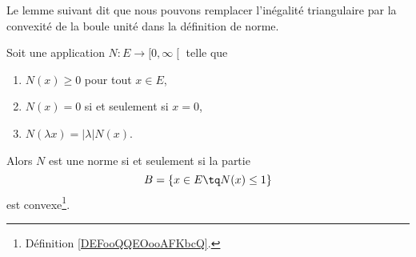 Le lemme suivant dit que nous pouvons remplacer l'inégalité triangulaire par la convexité de la boule unité dans la définition de norme.
\begin{lemma}     \label{LEMooAVIJooFhdXXr}
	Soit une application \( N\colon E\to \mathopen[ 0 , \infty \mathclose[\) telle que
	\begin{enumerate}
		\item
		      \( N(x)\geq 0\) pour tout \( x\in E\),
		\item
		      \( N(x)=0\) si et seulement si \( x=0\),
		\item
		      \( N(\lambda x)=| \lambda | N(x)\).
	\end{enumerate}
	Alors \( N\) est une norme si et seulement si la partie
	\begin{equation}
		B = \{ x\in E\tq N(x)\leq 1 \}
	\end{equation}
	est convexe\footnote{Définition \ref{DEFooQQEOooAFKbcQ}.}.
\end{lemma}

